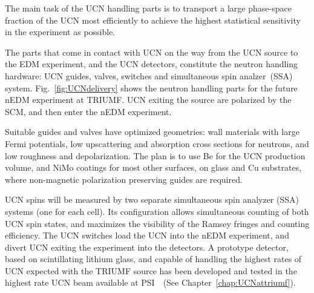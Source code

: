 The main task of the UCN handling parts is to transport a large
phase-space fraction of the UCN most efficiently to achieve the
highest statistical sensitivity in the experiment as possible.

The parts that come in contact with UCN on the way from the UCN source
to the EDM experiment, and the UCN detectors, constitute the neutron
handling hardware: UCN guides, valves, switches and simultaneous spin
analzer~(SSA) system. Fig.~\ref{fig:UCNdelivery} shows the neutron
handling parts for the future nEDM experiment at TRIUMF.  UCN exiting the
source are polarized by the SCM, and then enter the nEDM experiment.

Suitable guides and valves have optimized geometries: wall materials
with large Fermi potentials, low upscattering and absorption cross
sections for neutrons, and low roughness and depolarization. The plan is
to use Be for the UCN production volume, and NiMo coatings for most
other surfaces, on glass and Cu substrates, where non-magnetic
polarization preserving guides are required.  

UCN spins will be measured by two separate simultaneous spin analyzer
(SSA) systems (one for each cell). Its configuration allows
simultaneous counting of both UCN spin states, and maximizes the
visibility of the Ramsey fringes and counting efficiency.  The UCN
switches load the UCN into the nEDM experiment, and divert UCN exiting
the experiment into the detectors.  A prototype detector, based on
scintillating lithium glass, and capable of handling the highest rates
of UCN expected with the TRIUMF source has been developed and tested
in the highest rate UCN beam available at
PSI~\cite{jamieson2017characterization}~(See
Chapter~\ref{chap:UCNattriumf}).





